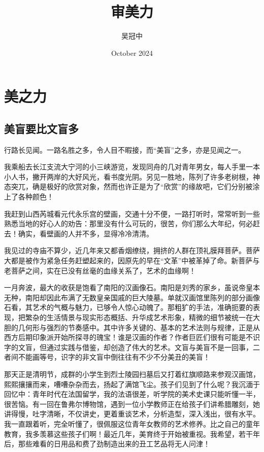 \documentclass{article}
\title{审美力}
\author{吴冠中}
\date{October 2024}
\begin{document}
\maketitle

\section{美之力}
\subsection{美盲要比文盲多}

行路长见闻。一路名胜之多，令人目不暇接，而“美盲”之多，亦是见闻之一。

我乘船去长江支流大宁河的小三峡游览，发现同舟的几对青年男女，每人手里一本小人书，撇开两岸的大好风光，看书度光阴。另见一胜地，陈列了许多老树根，神态突兀，确是极好的欣赏对象，然而也许正是为了“欣赏”的缘故吧，它们分别被涂上了各种颜色！

我赶到山西芮城看元代永乐宫的壁画，交通十分不便，一路打听时，常常听到一些熟悉当地的好心人的劝告：那里没有什么可玩的，很苦，你们那么大年纪，何必赶去！确实，看壁画的人并不多，显得冷冷清清。

我见过的寺庙不算少，近几年来又都香烟缭绕，拥挤的人群在顶礼膜拜菩萨。菩萨大都是被作为紧急任务赶塑起来的，因原先的早在“文革”中被革掉了命。新菩萨与老菩萨之间，实在已没有丝毫的血缘关系了，艺术的血缘啊！

一月奔波，最大的收获是饱看了南阳的汉画像石。南阳是刘秀的家乡，虽说帝皇本无种，南阳却因此布满了无数皇亲国戚的巨大陵墓。单就汉画馆里陈列的部分画像石看，其艺术的气概与魅力，已够令人惊心动魄了。那粗犷的手法，准确扼要的表现，把繁杂的生活情景与现实形态概括、升华成艺术形象，精微的细节被统一在大胆的几何形与强烈的节奏感中。其中许多关键的、基本的艺术法则与规律，正是从西方后期印象派开始所探寻的瑰宝！谁是汉画的作者？作者巨匠们很有可能是不识字的文盲，但通过实践与借鉴，却创造了伟大的艺术。文盲与美盲不是一回事，二者间不能画等号，识字的非文盲中倒往往有不少不分美丑的美盲！

那天正是清明节，成群的小学生到烈士陵园扫墓后又打着红旗顺路来参观汉画馆，熙熙攘攘而来，嘈嘈杂杂而去，扬起了满馆飞尘。孩子们见到了什么呢？我沉湎于回忆中：青年时代在法国留学，我的法语很差，听学院的美术史课只能听懂一半，很苦恼。有一回在鲁弗尔博物馆，遇到一位小学教师正在给孩子们讲希腊雕刻，她讲得慢，吐字清晰，不仅讲史，更着重谈艺术，分析造型，深入浅出，很有水平。我一直跟着听，完全听懂了，很佩服这位青年女教师的艺术修养。比之自己的童年教育，我多羡慕这些孩子们啊！最近几年，美育终于开始被重视。我希望，若干年后，那些难看的日用品和费了劲制造出来的丑工艺品将无人问津！
\end{document}
